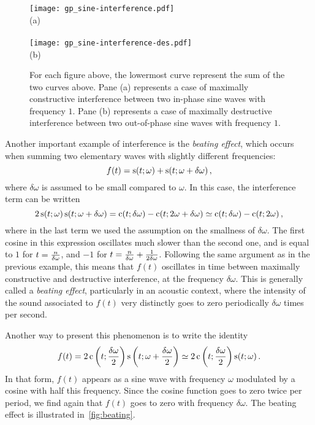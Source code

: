 \begin{figure}[ph!]
  \centering
  \texttt{[image: gp\_sine-interference.pdf]}
  \\\hspace{0.7cm}(a)\\~\\
  \texttt{[image: gp\_sine-interference-des.pdf]}
  \\\hspace{0.7cm}(b)\\
  \caption{For each figure above, the lowermost curve represent the sum of the two curves
    above. Pane (a) represents a case of maximally constructive interference between two
    in-phase sine waves with frequency $1$. Pane (b) represents a case of maximally
  destructive interference between two out-of-phase sine waves with frequency $1$.}
  \label{fig:interference}
\end{figure}
\begin{example}
  Another important example of interference is the \emph{beating effect}, which occurs
  when summing two elementary waves with slightly different frequencies:
  \begin{equation}
    f(t)=\operatorname{s}(t;\omega)+\operatorname{s}(t;\omega+\delta\omega)\,,
  \end{equation}
  where $\delta\omega$ is assumed to be small compared to $\omega$. In this case, the
  interference term can be written
  \begin{equation}
    2\operatorname{s}(t;\omega)\operatorname{s}(t;\omega+\delta\omega)=\operatorname{c}(t;\delta\omega)-\operatorname{c}(t;2\omega+\delta\omega)
    \simeq \operatorname{c}(t;\delta\omega)-\operatorname{c}(t;2\omega)\,,
  \end{equation}
  where in the last term we used the assumption on the smallness of $\delta\omega$. The
  first cosine in this expression oscillates much slower than the second one, and is equal
  to $1$ for $t=\smash{\frac{n}{\delta\omega}}$, and $-1$ for
  $t=\smash{\frac{n}{\delta\omega}+\frac{1}{2\delta\omega}}$. Following the same argument
  as in the previous example, this means that $f(t)$ oscillates in time between maximally
  constructive and destructive interference, at the frequency $\delta\omega$. This is
  generally called a \emph{beating effect}, particularly in an acoustic context, where the
  intensity of the sound associated to $f(t)$ very distinctly goes to zero periodically
  $\delta\omega$ times per second.

  Another way to present this phenomenon is to write the identity
  \begin{equation}
    f(t)=2\operatorname{c}\left(t;\frac{\delta\omega}{2}\right)
    \operatorname{s}\left(t;\omega+\frac{\delta\omega}{2}\right)
    \simeq 2\operatorname{c}\left(t;\frac{\delta\omega}{2}\right)\operatorname{s}(t;\omega)\,.
  \end{equation}
  In that form, $f(t)$ appears as a sine wave with frequency $\omega$ modulated by a
  cosine with half this frequency. Since the cosine function goes to zero twice per
  period, we find again that $f(t)$ goes to zero with frequency $\delta\omega$. The
  beating effect is illustrated in~\cref{fig:beating}.
\end{example}
